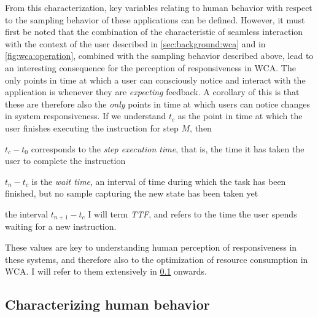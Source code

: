 %
From this characterization, key variables relating to human behavior with respect to the sampling behavior of these applications can be defined.
However, it must first be noted that the combination of the characteristic of seamless interaction with the context of the user described in \cref{sec:background:wca} and in \cref{fig:wca:operation}, combined with the sampling behavior described above, lead to an interesting consequence for the perception of responsiveness in \gls{WCA}.
The only points in time at which a user can consciously notice and interact with the application is whenever they are \emph{expecting} feedback.
A corollary of this is that these are therefore also the \emph{only} points in time at which users can notice changes in system responsiveness.
If we understand \ensuremath{t_c} as the point in time at which the user finishes executing the instruction for step \ensuremath{M}, then
\begin{inlineenum}
    \item \ensuremath{t_c - t_0} corresponds to the \emph{step execution time}, that is, the time it has taken the user to complete the instruction
    \item \ensuremath{t_n - t_c} is the \emph{wait time}, an interval of time during which the task has been finished, but no sample capturing the new state has been taken yet
    \item the interval \ensuremath{t_{n + 1} - t_c} I will term \emph{\gls{TTF}}, and refers to the time the user spends waiting for a new instruction.
\end{inlineenum}
These values are key to understanding human perception of responsiveness in these systems, and therefore also to the optimization of resource consumption in \gls{WCA}.
I will refer to them extensively in \cref{ssec:characterizing} onwards.

\subsection{Characterizing human behavior}\label{ssec:characterizing}

